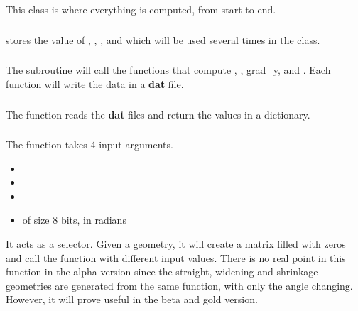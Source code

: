 \subsection{}
This class is where everything is computed, from start to end.

\subsubsection{\textcolor{func}{}}
\textcolor{func}{} stores the value of , , ,  and
 which will be used several times in the class.

\subsubsection{\textcolor{func}{}}
The subroutine \textcolor{func}{} will call the functions that compute ,
, grad\_y,  and . Each function
will write the data in a \textbf{dat} file.

\subsubsection{\textcolor{func}{}}
The function \textcolor{func}{} reads the \textbf{dat} files and return the
values in a dictionary.

\subsubsection{\textcolor{func}{}}
The function \textcolor{func}{} takes 4 input arguments.
\begin{itemize}
      \item {}
      \item {}
      \item {}
      \item {} of size 8 bits, in radians
\end{itemize}
It acts as a selector. Given a geometry, it will create a matrix  filled
with zeros and call the function \textcolor{func}{} with different input
values. There is no real point in this function in the alpha version since the
straight, widening and shrinkage geometries are generated from the same
function, with only the angle changing. However, it will prove useful in the
beta and gold version.

